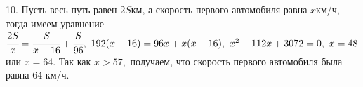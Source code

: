 10. Пусть весь путь равен $2S$км, а скорость первого автомобиля равна $x$км/ч, тогда имеем уравнение $\cfrac{2S}{x}=\cfrac{S}{x-16}+\cfrac{S}{96},\
192(x-16)=96x+x(x-16),\ x^2-112x+3072=0,\ x=48$ или $x=64.$ Так как $x>57,$ получаем, что скорость первого автомобиля была равна 64 км/ч.\\
